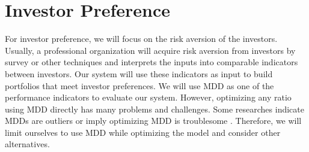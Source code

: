 \section{Investor Preference}
For investor preference, we will focus on the risk aversion of the investors. Usually, a professional organization will acquire risk aversion from investors by survey or other techniques and interprets the inputs into comparable indicators between investors.  Our system will use these indicators as input to build portfolios that meet investor preferences. We will use MDD as one of the performance indicators to evaluate our system. However, optimizing any ratio using MDD directly has many problems and challenges. Some researches indicate MDDs are outliers \cite {johansen2002large, johansen1998stock} or imply optimizing MDD is troublesome \cite{moody1998performance}. Therefore, we will limit ourselves to use MDD while optimizing the model and consider other alternatives. 